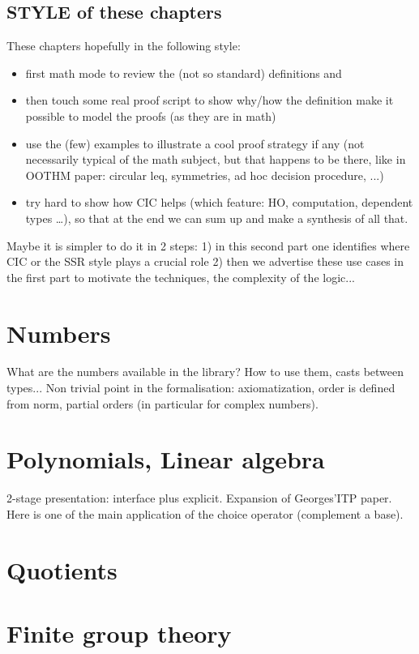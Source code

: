 \documentclass{book}
\begin{document}
\section{STYLE of these chapters}
These chapters hopefully in the following style:
\begin{itemize}
\item first math mode to review the (not so standard) definitions and
\item then touch some real proof script to show why/how the definition
  make it possible to model the proofs (as they are in math)
\item use the (few) examples to illustrate a cool proof strategy if
  any (not necessarily typical of the math subject, but that happens to
  be there, like in OOTHM paper: circular leq, symmetries, ad hoc
  decision procedure, ...)
\item try hard to show how CIC helps (which feature: HO, computation, dependent
	types \ldots), so that at the end we can sum up and make a synthesis of
	all that.
\end{itemize}

Maybe it is simpler to do it in 2 steps:
1) in this second part one identifies where CIC or the SSR style plays a
   crucial role
2) then we advertise these use cases in the first part to motivate
   the techniques, the complexity of the logic...

\chapter{Numbers}

What are the numbers available in the library? How to use them, casts
between types... Non trivial point in the formalisation:
axiomatization, order is defined from norm, partial orders (in
particular for complex numbers).


\chapter{Polynomials, Linear algebra}

2-stage presentation: interface plus explicit. Expansion of
Georges'ITP paper. Here is one of the main application of the choice
operator (complement a base).

\chapter{Quotients}

\chapter{Finite group theory}
\end{document}
